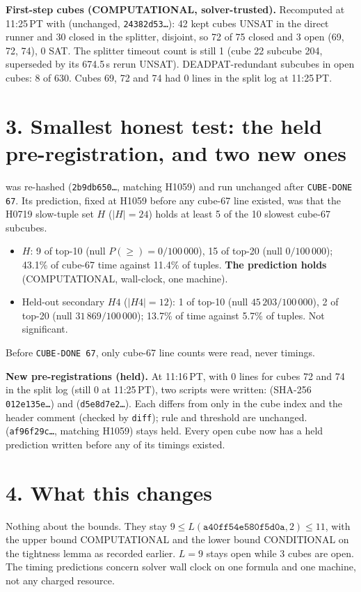 \documentclass[11pt]{article}
\begin{document}
\textbf{First-step cubes (COMPUTATIONAL, solver-trusted).} Recomputed at 11:25\,PT with  (unchanged, \texttt{24382d53\ldots}): 42 kept cubes UNSAT in the direct runner and 30 closed in the splitter, disjoint, so 72 of 75 closed and 3 open (69, 72, 74), 0 SAT. The splitter timeout count is still 1 (cube 22 subcube 204, superseded by its 674.5\,s rerun UNSAT). DEADPAT-redundant subcubes in open cubes: 8 of 630. Cubes 69, 72 and 74 had 0 lines in the split log at 11:25\,PT.

\section*{3. Smallest honest test: the held pre-registration, and two new ones}
 was re-hashed (\texttt{2b9db650\ldots}, matching H1059) and run unchanged after \texttt{CUBE-DONE 67}. Its prediction, fixed at H1059 before any cube-67 line existed, was that the H0719 slow-tuple set $H$ ($|H|=24$) holds at least 5 of the 10 slowest cube-67 subcubes.
\begin{itemize}
\item $H$: 9 of top-10 (null $P(\ge)=0/100\,000$), 15 of top-20 (null $0/100\,000$); 43.1\% of cube-67 time against 11.4\% of tuples. \textbf{The prediction holds} (COMPUTATIONAL, wall-clock, one machine).
\item Held-out secondary $H4$ ($|H4|=12$): 1 of top-10 (null $45\,203/100\,000$), 2 of top-20 (null $31\,869/100\,000$); 13.7\% of time against 5.7\% of tuples. Not significant.
\end{itemize}
Before \texttt{CUBE-DONE 67}, only cube-67 line counts were read, never timings.

\textbf{New pre-registrations (held).} At 11:16\,PT, with 0 lines for cubes 72 and 74 in the split log (still 0 at 11:25\,PT), two scripts were written:  (SHA-256 \texttt{012e135e\ldots}) and  (\texttt{d5e8d7e2\ldots}). Each differs from  only in the cube index and the header comment (checked by \texttt{diff}); rule and threshold are unchanged.  (\texttt{af96f29c\ldots}, matching H1059) stays held. Every open cube now has a held prediction written before any of its timings existed.

\section*{4. What this changes}
Nothing about the bounds. They stay $9\le L(\texttt{a40ff54e580f5d0a},2)\le 11$, with the upper bound COMPUTATIONAL and the lower bound CONDITIONAL on the tightness lemma as recorded earlier. $L=9$ stays open while 3 cubes are open. The timing predictions concern solver wall clock on one formula and one machine, not any charged resource.
\end{document}
